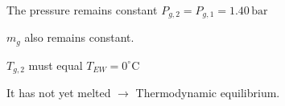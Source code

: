 The pressure remains constant \( P_{g,2} = P_{g,1} = 1.40 \, \text{bar} \)  

\( m_g \) also remains constant.  

\( T_{g,2} \) must equal \( T_{EW} = 0^\circ \text{C} \)  

It has not yet melted \( \rightarrow \) Thermodynamic equilibrium.